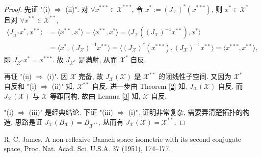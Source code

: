 \documentclass[a4paper,11pt]{article}
\theoremstyle{definition}
\begin{document}
\begin{CJK*}{UTF8}{gbsn}
\begin{proof}
    先证 "(i) $\Longrightarrow$ (ii)". 对 $ \forall x^{***} \in \mathcal{X}^{***} $,
    令 $ x^* := (J_\mathcal{X})^* (x^{***}) $, 
    则 $ x^* \in \mathcal{X}^* $ 且对 $ \forall x^{**} \in \mathcal{X}^{**} $,
    \begin{align*}
        \langle J_{\mathcal{X}^*} x^*, x^{**} \rangle
            &= \langle x^{**}, x^* \rangle
            = \langle x^{**}, x^* \rangle
            = \langle J_\mathcal{X} ((J_\mathcal{X})^{-1} x^{**}), x^* \rangle \\
            &= \langle x^*, (J_\mathcal{X})^{-1} x^{**} \rangle
            = \langle (J_\mathcal{X})^* (x^{***}), (J_\mathcal{X})^{-1} x^{**} \rangle
            = \langle x^{***}, x^{**} \rangle,
    \end{align*}
    即 $ J_{\mathcal{X}^*} x^* = x^{***} $. 故 $ J_{\mathcal{X}^*} $ 是满射, 从而 $ \mathcal{X}^* $ 自反.
    
    再证 "(ii) $\Longrightarrow$ (i)". 
    因 $ \mathcal{X} $ 完备, 故 $ J_\mathcal{X}(\mathcal{X}) $ 是 $ \mathcal{X}^{**} $ 的闭线性子空间.
    又因为 $ \mathcal{X}^* $ 自反和 "(i) $\Longrightarrow$ (ii)" 知, $ \mathcal{X}^{**} $ 自反.
    进一步由 Theorem \ref{2} 知, $ J_\mathcal{X}(\mathcal{X}) $ 自反. 
    而 $ J_\mathcal{X}(\mathcal{X}) $ 与 $ \mathcal{X} $ 等距同构, 故由 Lemma \ref{3} 知, $ \mathcal{X} $ 自反.
    
     "(i) $\Longrightarrow$ (iii)" 是经典结论.
     下证 "(iii) $\Longrightarrow$ (i)". 
     证明非常复杂, 需要弄清楚拓扑的构造.
     思路是证 $ J_\mathcal{X}(B_\mathcal{X}) = B_{\mathcal{X}^{**}} $, 
     从而有 $ J_\mathcal{X}(\mathcal{X}) = \mathcal{X}^{**} $.
\end{proof}

\begin{thebibliography}{99}
     R. C. James, A non-reflexive Banach space isometric with its second conjugate space,
     Proc. Nat. Acad. Sci. U.S.A. 37 (1951), 174--177.
\end{thebibliography}

\end{CJK*}
\end{document}
